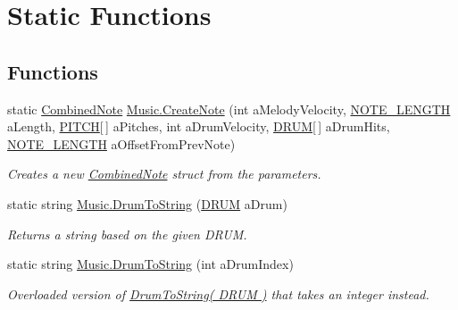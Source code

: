\hypertarget{group___music_static_func}{}\section{Static Functions}
\label{group___music_static_func}
\subsection*{Functions}
\begin{DoxyCompactItemize}
\item 
static \hyperlink{group___music_structs_struct_music_1_1_combined_note}{Combined\+Note} \hyperlink{group___music_static_func_gaaf74885e43eb623f64f961985fadcd08}{Music.\+Create\+Note} (int a\+Melody\+Velocity, \hyperlink{group___music_enums_gaf11b5f079adbb21c800b9eca1c5c3cbd}{N\+O\+T\+E\+\_\+\+L\+E\+N\+G\+TH} a\+Length, \hyperlink{group___music_enums_ga508f69b199ea518f935486c990edac1d}{P\+I\+T\+CH}\mbox{[}$\,$\mbox{]} a\+Pitches, int a\+Drum\+Velocity, \hyperlink{group___music_enums_gade475b4382c7066d1af13e7c13c029b6}{D\+R\+UM}\mbox{[}$\,$\mbox{]} a\+Drum\+Hits, \hyperlink{group___music_enums_gaf11b5f079adbb21c800b9eca1c5c3cbd}{N\+O\+T\+E\+\_\+\+L\+E\+N\+G\+TH} a\+Offset\+From\+Prev\+Note)
\begin{DoxyCompactList}\small\item\em Creates a new \hyperlink{group___music_structs_struct_music_1_1_combined_note}{Combined\+Note} struct from the parameters. \end{DoxyCompactList}\item 
static string \hyperlink{group___music_static_func_gaf5f64ebe9a7e036e07f283e41f26d22b}{Music.\+Drum\+To\+String} (\hyperlink{group___music_enums_gade475b4382c7066d1af13e7c13c029b6}{D\+R\+UM} a\+Drum)
\begin{DoxyCompactList}\small\item\em Returns a string based on the given D\+R\+UM. \end{DoxyCompactList}\item 
static string \hyperlink{group___music_static_func_gab74179676b93b41cde2d1cc18af0e788}{Music.\+Drum\+To\+String} (int a\+Drum\+Index)
\begin{DoxyCompactList}\small\item\em Overloaded version of \hyperlink{group___music_static_func_gaf5f64ebe9a7e036e07f283e41f26d22b}{Drum\+To\+String( D\+R\+U\+M )} that takes an integer instead. \end{DoxyCompactList}\item 

\end{DoxyCompactItemize}
